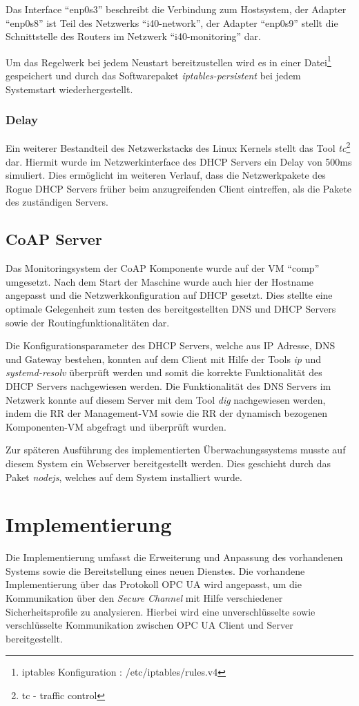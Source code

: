 Das Interface "`enp0s3"' beschreibt die Verbindung zum Hostsystem, der Adapter "`enp0s8"' ist Teil des Netzwerks "`i40-network"', der Adapter "`enp0s9"' stellt die Schnittstelle des Routers im Netzwerk "`i40-monitoring"' dar. 

Um das Regelwerk bei jedem Neustart bereitzustellen wird es in einer Datei\footnote{iptables Konfiguration : /etc/iptables/rules.v4} gespeichert und durch das Softwarepaket \textit{iptables-persistent} bei jedem Systemstart wiederhergestellt.

\subsubsection{Delay}
Ein weiterer Bestandteil des Netzwerkstacks des Linux Kernels stellt das Tool \textit{tc}\footnote{tc - traffic control} dar. Hiermit wurde im Netzwerkinterface des \ac{DHCP} Servers ein Delay von 500ms simuliert. Dies ermöglicht im weiteren Verlauf, dass die Netzwerkpakete des Rogue \ac{DHCP} Servers früher beim anzugreifenden Client eintreffen, als die Pakete des zuständigen Servers.

\subsection{\ac{CoAP} Server}
Das Monitoringsystem der \ac{CoAP} Komponente wurde auf der \ac{VM} "`comp"' umgesetzt. Nach dem Start der Maschine wurde auch hier der Hostname angepasst und die Netzwerkkonfiguration auf \ac{DHCP} gesetzt. Dies stellte eine optimale Gelegenheit zum testen des bereitgestellten \ac{DNS} und \ac{DHCP} Servers sowie der Routingfunktionalitäten dar.

Die Konfigurationsparameter des \ac{DHCP} Servers, welche aus \ac{IP} Adresse, \ac{DNS} und Gateway bestehen, konnten auf dem Client mit Hilfe der Tools \textit{ip} und \textit{systemd-resolv} überprüft werden und somit die korrekte Funktionalität des \ac{DHCP} Servers nachgewiesen werden. Die Funktionalität des \ac{DNS} Servers im Netzwerk konnte auf diesem Server mit dem Tool \textit{dig} nachgewiesen werden, indem die \ac{RR} der Management-\ac{VM} sowie die \ac{RR} der dynamisch bezogenen Komponenten-\ac{VM} abgefragt und überprüft wurden.

Zur späteren Ausführung des implementierten Überwachungssystems musste auf diesem System ein Webserver bereitgestellt werden. Dies geschieht durch das Paket \textit{nodejs}, welches auf dem System installiert wurde.

\section{Implementierung}
Die Implementierung umfasst die Erweiterung und Anpassung des vorhandenen Systems sowie die Bereitstellung eines neuen Dienstes. Die vorhandene Implementierung über das Protokoll \ac{OPC UA} wird angepasst, um die Kommunikation über den \textit{Secure Channel} mit Hilfe verschiedener Sicherheitsprofile zu analysieren. Hierbei wird eine unverschlüsselte sowie verschlüsselte Kommunikation zwischen \ac{OPC UA} Client und Server bereitgestellt.

